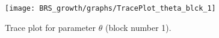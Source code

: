 \begin{figure}[H]
\centering
  \texttt{[image: BRS\_growth/graphs/TracePlot\_theta\_blck\_1]}\\
    \caption{Trace plot for parameter ${\theta}$ (block number 1).}
\end{figure}
